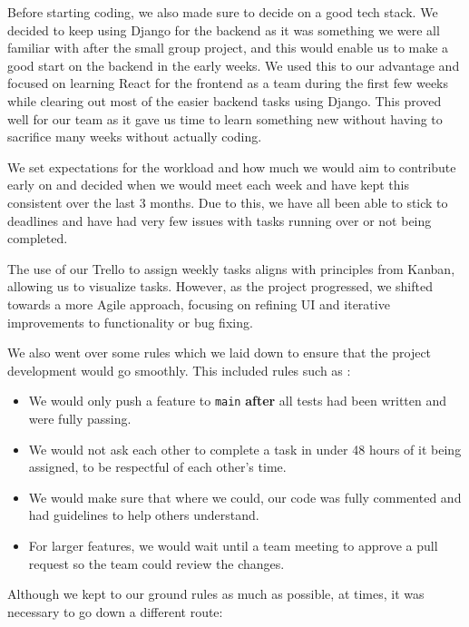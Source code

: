 Before starting coding, we also made sure to decide on a good tech stack. We decided to keep using Django for the backend as it was something we were all familiar with after the small group project, and this would enable us to make a good start on the backend in the early weeks. We used this to our advantage and focused on learning React for the frontend as a team during the first few weeks while clearing out most of the easier backend tasks using Django. This proved well for our team as it gave us time to learn something new without having to sacrifice many weeks without actually coding.

We set expectations for the workload and how much we would aim to contribute early on and decided when we would meet each week and have kept this consistent over the last 3 months. Due to this, we have all been able to stick to deadlines and have had very few issues with tasks running over or not being completed.

The use of our Trello to assign weekly tasks aligns with principles from Kanban, allowing us to visualize tasks. However, as the project progressed, we shifted towards a more Agile approach, focusing on refining UI and iterative improvements to functionality or bug fixing.


\vspace{20pt}

We also went over some rules which we laid down to ensure that the project development would go smoothly. This included rules such as :

\begin{itemize}
    \item We would only push a feature to \texttt{main} \textbf{after} all tests had been written and were fully passing.
    \item We would not ask each other to complete a task in under 48 hours of it being assigned, to be respectful of each other's time.
    \item We would make sure that where we could, our code was fully commented and had guidelines to help others understand.
    \item For larger features, we would wait until a team meeting to approve a pull request so the team could review the changes.
\end{itemize}

\vspace{20pt}

Although we kept to our ground rules as much as possible, at times, it was necessary to go down a different route:

